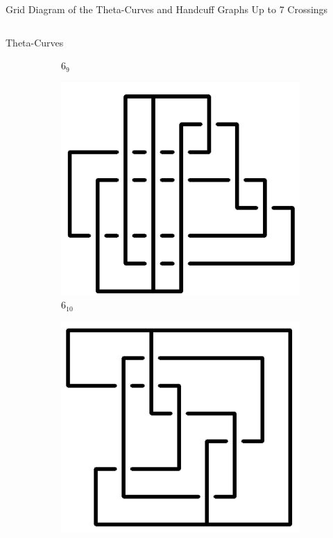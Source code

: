 \documentclass[final]{beamer}
\begin{document}
\begin{frame}[t]
\begin{alertblock}{Grid Diagram of the Theta-Curves and Handcuff Graphs Up to 7 Crossings}
\begin{columns}[t]
\begin{column}{0.5\textwidth}
\begin{alertblock}{Theta-Curves}
\begin{figure}
\begin{subfigure}{0.075\textwidth}
    \caption{$6_9$} 
    \end{subfigure}
    \begin{subfigure}{0.075\textwidth}
    \includegraphics[width=\columnwidth]{../Midterm_Poster/grid_diagram/theta_6_10.png}
    \caption{$6_{10}$} 
    \end{subfigure}
    \begin{subfigure}{0.075\textwidth}
    \includegraphics[width=\columnwidth]{../Midterm_Poster/grid_diagram/theta_6_11.png}

\end{subfigure}
\end{figure}
\end{alertblock}
\end{column}
\end{columns}
\end{alertblock}
\end{frame}
\end{document}
